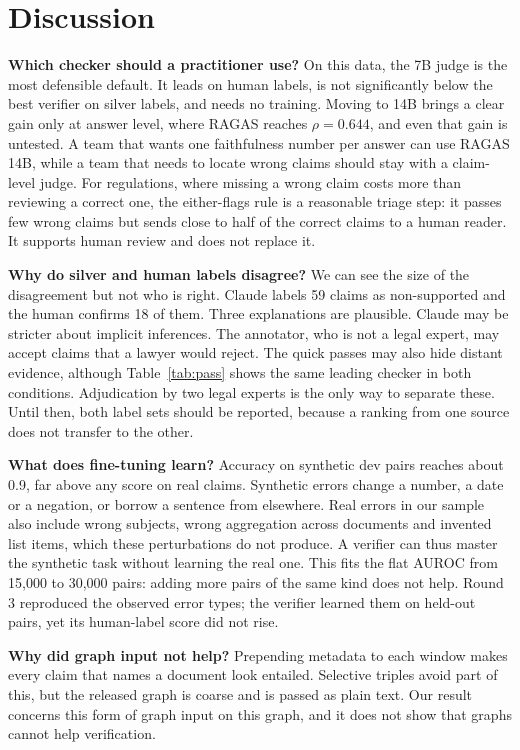 \documentclass[conference]{IEEEtran}
\begin{document}
\section{Discussion}
\textbf{Which checker should a practitioner use?} On this data, the 7B judge is the most defensible default. It leads on human labels, is not significantly below the best verifier on silver labels, and needs no training. Moving to 14B brings a clear gain only at answer level, where RAGAS reaches $\rho=0.644$, and even that gain is untested. A team that wants one faithfulness number per answer can use RAGAS 14B, while a team that needs to locate wrong claims should stay with a claim-level judge. For regulations, where missing a wrong claim costs more than reviewing a correct one, the either-flags rule is a reasonable triage step: it passes few wrong claims but sends close to half of the correct claims to a human reader. It supports human review and does not replace it.

\textbf{Why do silver and human labels disagree?} We can see the size of the disagreement but not who is right. Claude labels 59 claims as non-supported and the human confirms 18 of them. Three explanations are plausible. Claude may be stricter about implicit inferences. The annotator, who is not a legal expert, may accept claims that a lawyer would reject. The quick passes may also hide distant evidence, although Table~\ref{tab:pass} shows the same leading checker in both conditions. Adjudication by two legal experts is the only way to separate these. Until then, both label sets should be reported, because a ranking from one source does not transfer to the other.

\textbf{What does fine-tuning learn?} Accuracy on synthetic dev pairs reaches about 0.9, far above any score on real claims. Synthetic errors change a number, a date or a negation, or borrow a sentence from elsewhere. Real errors in our sample also include wrong subjects, wrong aggregation across documents and invented list items, which these perturbations do not produce. A verifier can thus master the synthetic task without learning the real one. This fits the flat AUROC from 15,000 to 30,000 pairs: adding more pairs of the same kind does not help. Round 3 reproduced the observed error types; the verifier learned them on held-out pairs, yet its human-label score did not rise.

\textbf{Why did graph input not help?} Prepending metadata to each window makes every claim that names a document look entailed. Selective triples avoid part of this, but the released graph is coarse and is passed as plain text. Our result concerns this form of graph input on this graph, and it does not show that graphs cannot help verification.
\end{document}
